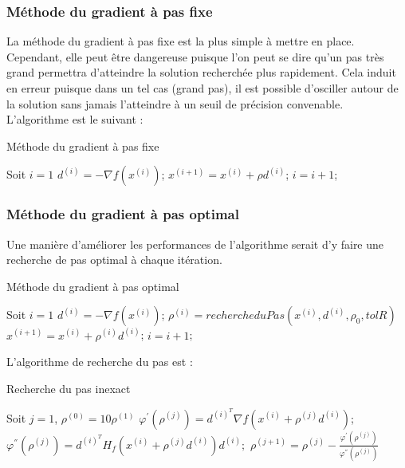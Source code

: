 \subsubsection{Méthode du gradient à pas fixe}
La méthode du gradient à pas fixe est la plus simple à mettre en place. Cependant, elle peut être dangereuse puisque l'on peut se dire qu'un pas très grand permettra d'atteindre la solution recherchée plus rapidement. Cela induit en erreur puisque dans un tel cas (grand pas), il est possible d'osciller autour de la solution sans jamais l'atteindre à un seuil de précision convenable. L'algorithme est le suivant :
\begin{algorithm}
	\caption{Méthode du gradient à pas fixe}
	\begin{algorithmic}[1]
		\State Soit $i=1$
		\State $d^{(i)}=-\nabla f(x^{(i)})$;
		\State $x^{(i+1)}=x^{(i)}+\rho d^{(i)}$;
		\State $i = i+1$;
		\EndWhile
		\EndProcedure
	\end{algorithmic}
\end{algorithm}
\subsubsection{Méthode du gradient à pas optimal}
Une manière d'améliorer les performances de l'algorithme serait d'y faire une recherche de pas optimal à chaque itération.
\begin{algorithm}[H]
	\caption{Méthode du gradient à pas  optimal}
	\begin{algorithmic}[1]
		\State Soit $i=1$
		\State $d^{(i)}=-\nabla f(x^{(i)})$;
		\State $\rho^{(i)}=rechercheduPas(x^{(i)},d^{(i)},\rho_0,tolR)$
		\State $x^{(i+1)}=x^{(i)}+\rho^{(i)} d^{(i)}$;
		\State $i = i+1$;
		\EndWhile
		\EndProcedure
	\end{algorithmic}
\end{algorithm}
L'algorithme de recherche du pas est :
\begin{algorithm}[H]
	\caption{Recherche du pas inexact}
	\begin{algorithmic}[1]
		\State Soit $j=1$, $\rho^{(0)}=10\rho^{(1)}$
		\State $\varphi^{'}(\rho^{(j)})=d^{(i)^T}\nabla f(x^{(i)}+\rho^{(j)}d^{(i)})$;
		\State $\varphi^{''}(\rho^{(j)})=d^{(i)^T} H_f(x^{(i)}+\rho^{(j)}d^{(i)})d^{(i)};$
		\State $\rho^{(j+1)}=\rho^{(j)}-\frac{\varphi^{'}(\rho^{(j)})}{\varphi^{''}(\rho^{(j)})}$
		\EndWhile
		\EndProcedure
		\end{algorithmic}
	\end{algorithm}
